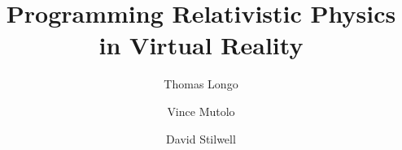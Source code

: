 \documentclass[12pt]{article}
\begin{document}
\title{Programming Relativistic Physics in Virtual Reality}
\author{Thomas Longo \and Vince Mutolo \and David Stilwell}
\maketitle
\end{document}
